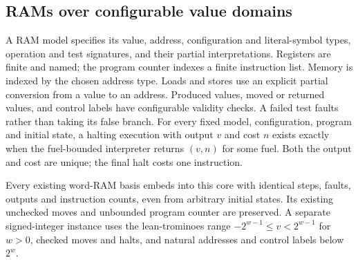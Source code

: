 \begin{result}
\subsection{RAMs over configurable value domains}
A RAM model specifies its value, address, configuration and literal-symbol types, operation and
test signatures, and their partial interpretations. Registers are finite and named; the program
counter indexes a finite instruction list. Memory is indexed by the chosen address type.
Loads and stores use an explicit partial conversion from a value to an address. Produced values,
moved or returned values, and control labels have configurable validity checks. A failed test
faults rather than taking its false branch. For every fixed model, configuration, program and
initial state, a halting execution with output $v$ and cost $n$ exists exactly when the
fuel-bounded interpreter returns $(v,n)$ for some fuel. Both the output and cost are unique;
the final halt costs one instruction.

Every existing word-RAM basis embeds into this core with identical steps, faults, outputs and
instruction counts, even from arbitrary initial states. Its existing unchecked moves and
unbounded program counter are preserved. A separate signed-integer instance uses the
lean-trominoes range $-2^{w-1}\le v<2^{w-1}$ for $w>0$, checked moves and halts, and natural
addresses and control labels below $2^w$.


\end{result}
